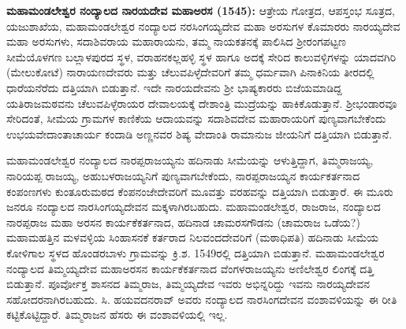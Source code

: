 \textbf{ಮಹಾಮಂಡಲೇಶ್ವರ ನಂದ್ಯಾಲದ ನಾರಯದೇವ ಮಹಾಅರಸ (1545):} ಆತ್ರೇಯ ಗೋತ್ರದ, ಆಪಸ್ತಂಭ ಸೂತ್ರದ, ಯಜುಶಾಖೆಯ, ಮಹಾಮಂಡಲೇಶ್ವರ ನಂದ್ಯಾಲದ ನರಸಿಂಗಯ್ಯದೇವ ಮಹಾ ಅರಸುಗಳ ಕೊಮಾರರು ನಾರಯ್ಯದೇವ ಮಹಾ ಅರಸುಗಳು, ಸದಾಶಿವರಾಯ ಮಹಾರಾಯನು, ತಮ್ಮ ನಾಯಕತನಕ್ಕೆ ಪಾಲಿಸಿದ ಶ‍್ರೀರಂಗಪಟ್ಟಣ ಸೀಮೆಯೊಳಗಣ ಬಲ್ಲಾಳಪುರದ ಸ್ಥಳ, ವರಾಹನಕಲ್ಲಹಳ್ಳಿ ಸ್ಥಳ ಹಾಗೂ ಅದಕ್ಕೆ ಸೇರಿದ ಕಾಲುವಳ್ಳಿಗಳನ್ನು ಯಾದವಗಿರಿ (ಮೇಲುಕೋಟೆ) ನಾರಾಯಣದೇವರು ಮತ್ತು ಚೆಲುವಪಿಳ್ಳೆದೇವರಿಗೆ ತಮ್ಮ ಧರ್ಮವಾಗಿ ಪಿನಾಕಿನಿಯ ತೀರದಲ್ಲಿ ಧಾರೆಯ\-ನೆರೆದು ದತ್ತಿಯಾಗಿ ಬಿಡುತ್ತಾನೆ. ಇದೇ ನಾರಯದೇವನು ಶ‍್ರೀ ಭಾಷ್ಯಕಾರರು ಬಿಜೆಯಮಾಡಿದ್ದ ಯತಿರಾಜಮಠವನು ಚೆಲುವಪಿಳ್ಳೆರಾಯರ ದೇವಾಲಯಕ್ಕೆ ದೇಶಾಂತ್ರಿ ಮುದ್ರೆಯನ್ನು ಹಾಕಿಕೊಡುತ್ತಾನೆ. ಶ‍್ರೀಭಂಡಾರವೂ ಸೇರಿದಂತೆ, ಸೀಮೆಯ ಗ್ರಾಮಗಳ ಕಾಣಿಕೆಯ ಆದಾಯವನ್ನು ಸದಾಶಿವದೇವ ಮಹಾರಾಯರಿಗೆ ಪುಣ್ಯವಾಗಬೇಕೆಂದು ಉಭಯವೇದಾಂತಾಚಾರ್ಯ ಕಂದಾಡಿ ಅಣ್ಣನವರ ಶಿಷ್ಯ ವೇದಾಂತಿ ರಾಮಾನುಜ ಜೀಯನಿಗೆ ದತ್ತಿಯಾಗಿ ಬಿಡುತ್ತಾನೆ.

ಮಹಾಮಂಡಲೇಶ್ವರ ನಂದ್ಯಾಲದ ನಾರಪ್ಪರಾಜಯ್ಯನು ಹದಿನಾಡು ಸೀಮೆಯನ್ನು ಆಳುತ್ತಿದ್ದಾಗ, ತಿಮ್ಮರಾಜಯ್ಯ, ನಾರಿಯಪ್ಪ ರಾಜಯ್ಯ, ಅಹುಬಳರಾಜಯ್ಯನಿಗೆ ಪುಣ್ಯವಾಗಬೇಕೆಂದು, ನಾರಪ್ಪರಾಜಯ್ಯನ ಕಾರ್ಯಕರ್ತನಾದ ಕಂಪಂಣಗಳು ಕುಂತೂರುಮಠದ ಕೆಂಪನಂಜೇದೇವರಿಗೆ ಮೂವತ್ತು ವರಹವನ್ನು ದತ್ತಿಯಾಗಿ ಬಿಡುತ್ತಾರೆ. ಈ ಮೂರು ಜನರೂ ನಂದ್ಯಾಲದ ನಾರಸಿಂಗಯ್ಯದೇವನ ಮಕ್ಕಳಾಗಿರಬಹುದು. ಮಹಾಮಂಡಲೇಶ್ವರ, ರಾಜರಾಜ, ನಂದ್ಯಾಲದ ನಾರಪ್ಪರಾಜ ಮಹಾ ಅರಸನ ಕಾರ್ಯಕೆಕರ್ತನಾದ, ಹದಿನಾಡ ಚಾಮರಸಗೌಡನು (ಚಾಮರಾಜ ಒಡೆಯ?) ಮಹಾಮಹತ್ತಿನ ಮಳವಳ್ಳಿಯ ಸಿಂಹಾಸನಕೆ ಕರ್ತರಾದ ನಿಲವಂದದೇವರಿಗೆ (ಮಠಾಧಿಪತಿ) ಹದಿನಾಡು ಸೀಮೆಯ ಕೋಳಿಗಾಲ ಸ್ಥಳದ ಹೊಂಡರಬಾಳು ಗ್ರಾಮವನ್ನು ಕ್ರಿ.ಶ. 1549ರಲ್ಲಿ ದತ್ತಿಯಾಗಿ ಬಿಡುತ್ತಾನೆ. ಮಹಾಮಂಡಲೇಶ್ವರ ನಂದ್ಯಾಲದ ತಿಮ್ಮಯ್ಯದೇವ ಮಹಾಅರಸನ ಕಾರ್ಯಕೆಕರ್ತನಾದ ವೆಂಗಳರಾಜಯ್ಯನು ಅಣಿಲೇಶ್ವರ ಲಿಂಗಕ್ಕೆ ದತ್ತಿ ಬಿಡುತ್ತಾನೆ. ಪೂರ್ವೋಕ್ತ ಶಾಸನದ ತಿಮ್ಮರಾಜ, ತಿಮ್ಮಯ್ಯದೇವ ಇವರು ಅಭಿನ್ನರಿದ್ದು ಇವನು ನಾರಯ್ಯದೇವನ ಸಹೋದರನಾಗಿರಬಹುದು. ಸಿ. ಹಯವದನರಾವ್​ ಅವರು ನಂದ್ಯಾಲದ ನಾರಸಿಂಗದೇವನ ವಂಶಾವಳಿಯನ್ನು ಈ ರೀತಿ ಕಟ್ಟಿಕೊಟ್ಟಿದ್ದಾರೆ. ತಿಮ್ಮರಾಜನ ಹೆಸರು ಈ ವಂಶಾವಳಿಯಲ್ಲಿ ಇಲ್ಲ.

